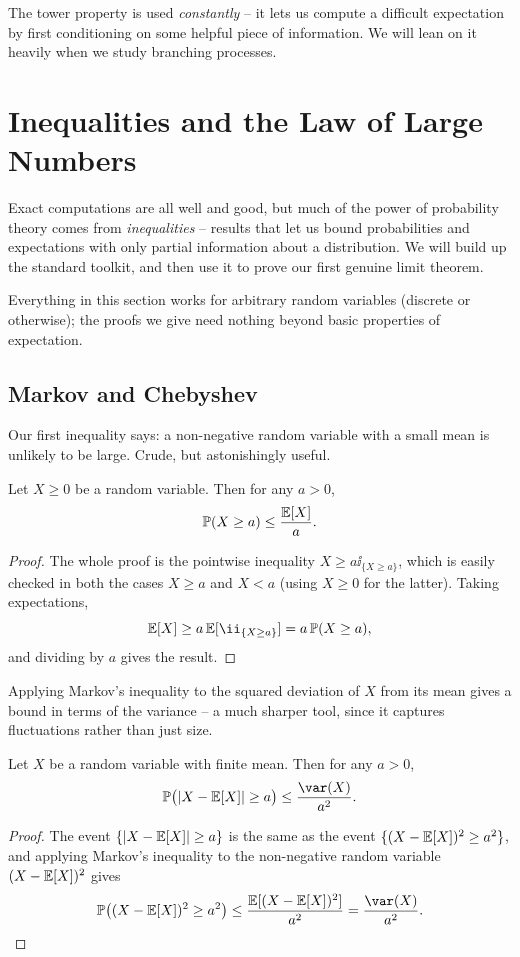 \documentclass[a4paper]{scrartcl}
\begin{document}
The tower property is used \emph{constantly} -- it lets us compute a difficult expectation by first conditioning on some helpful piece of information. We will lean on it heavily when we study branching processes.


\section{Inequalities and the Law of Large Numbers}

Exact computations are all well and good, but much of the power of probability theory comes from \emph{inequalities} -- results that let us bound probabilities and expectations with only partial information about a distribution. We will build up the standard toolkit, and then use it to prove our first genuine limit theorem.

Everything in this section works for arbitrary random variables (discrete or otherwise); the proofs we give need nothing beyond basic properties of expectation.

\subsection{Markov and Chebyshev}

Our first inequality says: a non-negative random variable with a small mean is unlikely to be large. Crude, but astonishingly useful.

\begin{theorem}
	Let $X \geq 0$ be a random variable. Then for any $a > 0$,
	$$
	\mathbb{P}(X \geq a) \leq \frac{\mathbb{E}[X]}{a}.
	$$
\end{theorem}
\begin{proof}
	The whole proof is the pointwise inequality $X \geq a \ii_{\{X \geq a\}}$, which is easily checked in both the cases $X \geq a$ and $X < a$ (using $X \geq 0$ for the latter). Taking expectations,
	$$
	\EE[X] \geq a \, \EE[\ii_{\{X \geq a\}}] = a\,\PP(X \geq a),
	$$
	and dividing by $a$ gives the result.
\end{proof}

Applying Markov's inequality to the squared deviation of $X$ from its mean gives a bound in terms of the variance -- a much sharper tool, since it captures fluctuations rather than just size.

\begin{theorem}
	Let $X$ be a random variable with finite mean. Then for any $a > 0$,
	$$
	\PP\big(|X - \EE[X]| \geq a\big) \leq \frac{\var(X)}{a^2}.
	$$
\end{theorem}
\begin{proof}
	The event $\{|X - \mathbb{E}[X]| \geq a\}$ is the same as the event $\{(X - \mathbb{E}[X])^2 \geq a^2\}$, and applying Markov's inequality to the non-negative random variable $(X - \mathbb{E}[X])^2$ gives
	$$
	\PP\big((X - \EE[X])^2 \geq a^2\big) \leq \frac{\EE[(X - \EE[X])^2]}{a^2} = \frac{\var(X)}{a^2}. \qedhere
	$$
\end{proof}
\end{document}
